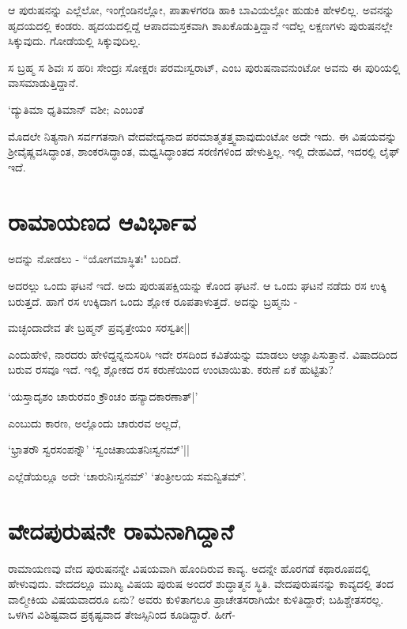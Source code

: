 ಆ ಪುರುಷನನ್ನು ಎಲ್ಲೆಲೋ, ಇಂಗ್ಲೆಂಡಿನಲ್ಲೋ, ಪಾತಾಳಗರಡಿ ಹಾಕಿ ಬಾವಿಯಲ್ಲೋ ಹುಡುಕಿ ಹೇಳಲಿಲ್ಲ. ಅವನನ್ನು ಹೃದಯದಲ್ಲಿ ಕಂಡರು. ಹೃದಯದಲ್ಲಿದ್ದೆ ಆಪಾದಮಸ್ತಕವಾಗಿ ಶಾಖಕೊಡುತ್ತಿದ್ದಾನೆ ಇದೆಲ್ಲ ಲಕ್ಷಣಗಳು ಪುರುಷನಲ್ಲೇ ಸಿಕ್ಕುವುದು. ಗೋಡೆಯಲ್ಲಿ ಸಿಕ್ಕುವುದಿಲ್ಲ. 

ಸ ಬ್ರಹ್ಮ ಸ ಶಿವಃ ಸ ಹರಿಃ ಸೇಂದ್ರಃ ಸೋಕ್ಷರಃ ಪರಮಃಸ್ವರಾಟ್, ಎಂಬ ಪುರುಷನಾವನುಂಟೋ ಅವನು ಈ ಪುರಿಯಲ್ಲಿ ವಾಸಮಾಡುತ್ತಿದ್ದಾನೆ.

\begin{shloka}
`ದ್ಯುತಿಮಾ ಧೃತಿಮಾನ್ ವಶೀ; ಎಂಬಂತೆ 
\end{shloka}

ಮೊದಲೇ ನಿತ್ಯನಾಗಿ ಸರ್ವಗತನಾಗಿ ವೇದವೇದ್ಯನಾದ ಪರಮಾತ್ಮತತ್ತ್ವವಾವುದುಂಟೋ ಅದೇ ಇದು. ಈ ವಿಷಯವನ್ನು ಶ್ರೀವೈಷ್ಣವಸಿದ್ಧಾಂತ, ಶಾಂಕರಸಿದ್ಧಾಂತ, ಮಧ್ವಸಿದ್ಧಾಂತದ ಸರಣಿಗಳಿಂದ ಹೇಳುತ್ತಿಲ್ಲ. ಇಲ್ಲಿ ದೇಹವಿದೆ, ಇದರಲ್ಲಿ ಲೈಫ್ ಇದೆ. 

\section*{ರಾಮಾಯಣದ ಆವಿರ್ಭಾವ}

\begin{shloka}
ಅದನ್ನು ನೋಡಲು - ``ಯೋಗಮಾಸ್ಥಿತಃ" ಬಂದಿದೆ.
\end{shloka}

ಅದರಲ್ಲು ಒಂದು ಘಟನೆ ಇದೆ. ಅದು ಪುರುಷಪಕ್ಷಿಯನ್ನು ಕೊಂದ ಘಟನೆ. ಆ ಒಂದು ಘಟನೆ ನಡೆದು ರಸ ಉಕ್ಕಿ ಬರುತ್ತದೆ. ಹಾಗೆ ರಸ ಉಕ್ಕಿದಾಗ ಒಂದು ಶ್ಲೋಕ ರೂಪತಾಳುತ್ತದೆ. ಅದನ್ನು ಬ್ರಹ್ಮನು -

\begin{shloka}
ಮಚ್ಛಂದಾದೇವ ತೇ ಬ್ರಹ್ಮನ್  ಪ್ರವೃತ್ತೇಯಂ ಸರಸ್ವತೀ||
\end{shloka}

ಎಂದುಹೇಳಿ, ನಾರದರು ಹೇಳಿದ್ದನ್ನನುಸರಿಸಿ ಇದೇ ರಸದಿಂದ ಕವಿತೆಯನ್ನು ಮಾಡಲು ಆಜ್ಞಾಪಿಸುತ್ತಾನೆ. ವಿಷಾದದಿಂದ ಬರುವ ರಸವೂ ಇದೆ. ಇಲ್ಲಿ ಶ್ಲೋಕದ ರಸ ಕರುಣೆಯಿಂದ ಉಂಟಾಯಿತು. ಕರುಣೆ ಏಕೆ ಹುಟ್ಟಿತು? 

\begin{shloka}
`ಯಸ್ತಾದೃಶಂ ಚಾರುರವಂ ಕ್ರೌಂಚಂ ಹನ್ಯಾದಕಾರಣಾತ್|'
\end{shloka}
ಎಂಬುದು ಕಾರಣ, ಅಲ್ಲೊಂದು ಚಾರುರವ ಅಲ್ಲದೆ, 

\begin{shloka}
`ಭ್ರಾತರೌ ಸ್ವರಸಂಪನ್ನೌ' `ಸ್ವಂಚಿತಾಯತನಿಃಸ್ವನಮ್'||
\end{shloka}

ಎಲ್ಲೆಡೆಯಲ್ಲೂ ಅದೇ `ಚಾರುನಿಃಸ್ವನಮ್' `ತಂತ್ರೀಲಯ ಸಮನ್ವಿತಮ್'.

\section*{ವೇದಪುರುಷನೇ ರಾಮನಾಗಿದ್ದಾನೆ}

ರಾಮಾಯಣವು ವೇದ ಪುರುಷನನ್ನೇ ವಿಷಯವಾಗಿ ಹೊಂದಿರುವ ಕಾವ್ಯ. ಅದನ್ನೇ ಹೊರಗಡೆ ಕಥಾರೂಪದಲ್ಲಿ ಹೇಳುವುದು. ವೇದದಲ್ಲೂ ಮುಖ್ಯ ವಿಷಯ ಪುರುಷ ಅಂದರೆ ಶುದ್ಧಾತ್ಮನ ಸ್ಥಿತಿ. ವೇದಪುರುಷನನ್ನು ಕಾವ್ಯದಲ್ಲಿ ತಂದ ವಾಲ್ಮೀಕಿಯ ವಿಷಯವಾದರೂ ಏನು? ಅವರು ಕುಳಿತಾಗಲೂ ಪ್ರಾಚೇತಸರಾಗಿಯೇ ಕುಳಿತಿದ್ದಾರೆ; ಬಹಿಶ್ಚೇತಸರಲ್ಲ. ಒಳಗಿನ ವಿಶಿಷ್ಟವಾದ ಪ್ರಕೃಷ್ಟವಾದ ತೇಜಸ್ಸಿನಿಂದ ಕೂಡಿದ್ದಾರೆ. ಹೀಗೆ-

